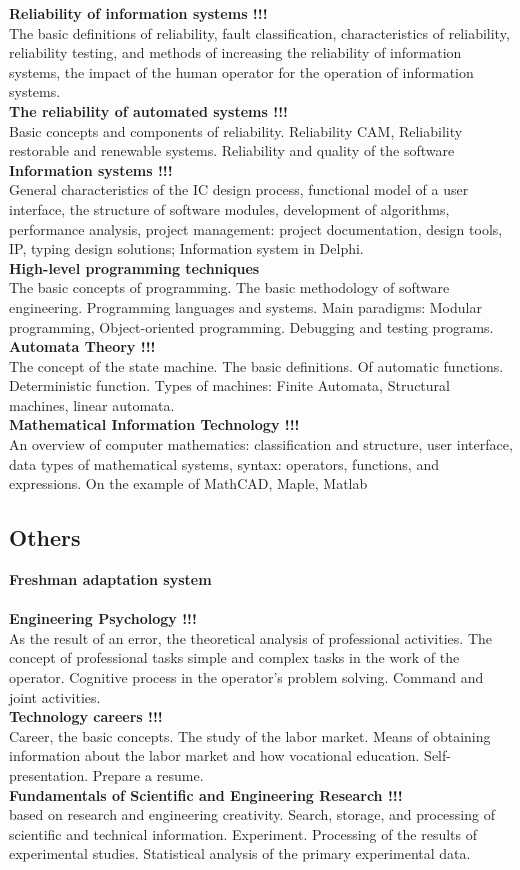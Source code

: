 \documentclass[a4paper, 12pt]{article}
\newcommand{\group}[1] {\subsection{#1}}
\newcommand{\discipline}[1] {\textbf{#1} \\ }
\newcommand{\desc}[1] { #1 \\ }
\begin{document}
\discipline{Reliability of information systems !!!}
\desc{The basic definitions of reliability, fault classification, characteristics of reliability, reliability testing, and methods of increasing the reliability of information systems, the impact of the human operator for the operation of information systems.}

\discipline{The reliability of automated systems !!!}
\desc{Basic concepts and components of reliability. Reliability CAM, Reliability restorable and renewable systems. Reliability and quality of the software}

\discipline{Information systems !!!}
\desc{General characteristics of the IC design process, functional model of a user interface, the structure of software modules, development of algorithms, performance analysis, project management: project documentation, design tools, IP, typing design solutions; Information system in Delphi.}

\discipline{High-level programming techniques}
\desc{The basic concepts of programming. The basic methodology of software engineering. Programming languages and systems. Main paradigms: Modular programming, Object-oriented programming. Debugging and testing programs.}

\discipline{Automata Theory !!!}
\desc{The concept of the state machine. The basic definitions. Of automatic functions. Deterministic function. Types of machines: Finite Automata, Structural machines, linear automata.}

\discipline{Mathematical Information Technology !!!}
\desc{An overview of computer mathematics: classification and structure, user interface, data types of mathematical systems, syntax: operators, functions, and expressions. On the example of MathCAD, Maple, Matlab}


\group{Others}

\discipline{Freshman adaptation system}
\desc{}

\discipline{Engineering Psychology !!!}
\desc{As the result of an error, the theoretical analysis of professional activities. The concept of professional tasks simple and complex tasks in the work of the operator. Cognitive process in the operator's problem solving. Command and joint activities.}

\discipline{Technology careers !!!}
\desc{Career, the basic concepts. The study of the labor market. Means of obtaining information about the labor market and how vocational education. Self-presentation. Prepare a resume.}

\discipline{Fundamentals of Scientific and Engineering Research !!!}
\desc{based on research and engineering creativity. Search, storage, and processing of scientific and technical information. Experiment. Processing of the results of experimental studies. Statistical analysis of the primary experimental data.}
\end{document}
